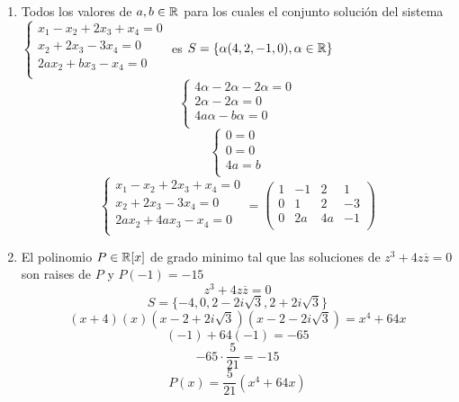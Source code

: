 \documentclass[../practica.root.tex]{subfiles}
\begin{document}
\begin{enumerate}
    \item Todos los valores de \(a, b \in \mathbb{R}\) para los cuales el conjunto solución del sistema \(\begin{cases}
              x_1 - x_2 + 2x_3 + x_4 = 0 \\
              x_2 + 2x_3 - 3x_4 = 0      \\
              2ax_2 + bx_3 - x_4 = 0     \\
          \end{cases}\) es \(S = \{\alpha(4,2,-1,0), \alpha \in \mathbb{R}\}\)
          \[
              \begin{cases}
                  4\alpha - 2\alpha - 2\alpha = 0 \\
                  2\alpha - 2\alpha = 0           \\
                  4a\alpha -b\alpha = 0           \\
              \end{cases}
          \] \[
              \begin{cases}
                  0 = 0  \\
                  0 = 0  \\
                  4a = b \\
              \end{cases}
          \] \[
              \begin{cases}
                  x_1 - x_2 + 2x_3 + x_4 = 0 \\
                  x_2 + 2x_3 - 3x_4 = 0      \\
                  2ax_2 + 4ax_3 - x_4 = 0    \\
              \end{cases}
              =
              \begin{pmatrix}
                  1 & -1 & 2  & 1  \\
                  0 & 1  & 2  & -3 \\
                  0 & 2a & 4a & -1 \\
              \end{pmatrix}
          \]

    \item El polinomio \(P \in \mathbb{R}[x]\) de grado minimo tal que las soluciones de \(z^3 + 4z\overline{z} = 0\) son raises de \(P\) y \(P(-1) = -15\)
          \[ z^3 + 4z\overline{z} = 0 \]
          \[ S = \{ -4, 0, 2-2i\sqrt{3}, 2+2i\sqrt{3} \} \]
          \[ (x+4)(x)(x-2+2i\sqrt{3})(x-2-2i\sqrt{3}) = x^4 + 64x \]
          \[ (-1)+64(-1) = -65 \]
          \[ -65\cdot\frac{5}{21} = -15 \]
          \[ \boxed{P(x) = \frac{5}{21}(x^4 + 64x)} \]



\end{enumerate}
\end{document}
